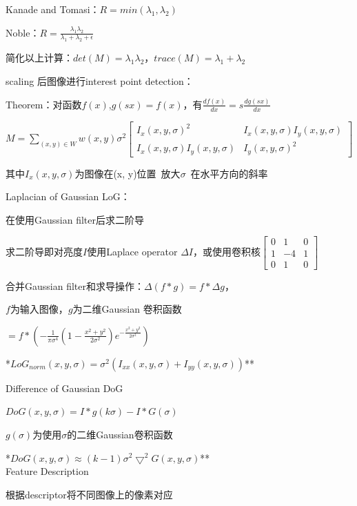 \documentclass[UTF8]{ctexart}
\begin{document}
  \quad \quad Kanade and Tomasi：$R = min(\lambda_1, \lambda_2)$

  \quad \quad Noble：$R = \frac{\lambda_1\lambda_2}{\lambda_1 + \lambda_2 + \epsilon}$

  \quad \quad 简化以上计算：$det(M) = \lambda_1\lambda_2$，$trace(M) = \lambda_1 + \lambda_2$

  scaling 后图像进行interest point detection：

  \quad Theorem：对函数$f(x)$,$g(sx) = f(x)$，有$\frac{df(x)}{dx} = s\frac{dg(sx)}{dx}$

  \quad $M = \sum_{(x, y) \in W}w(x, y)\sigma^2
    \begin{bmatrix}
      I_x(x, y, \sigma)^2 & I_x(x, y, \sigma)I_y(x, y, \sigma) \\
      I_x(x, y, \sigma)I_y(x, y, \sigma) & I_y(x, y, \sigma)^2
      \end{bmatrix}$

  \quad \quad 其中$I_x(x, y, \sigma)$为图像在(x, y)位置\ 放大$\sigma$\ 在水平方向的斜率

  Laplacian of Gaussian LoG：

  \quad 在使用Gaussian filter后求二阶导

  \quad \quad 求二阶导即对亮度$I$使用Laplace operator $\Delta I$，或使用卷积核$
    \begin{bmatrix}
      0 & 1 & 0 \\
      1 & -4 & 1 \\
      0 & 1 & 0
      \end{bmatrix}$

  \quad 合并Gaussian filter和求导操作：$\Delta (f * g) = f * \Delta g$，
  
  \quad \quad $f$为输入图像，$g$为二维Gaussian 卷积函数

  \quad \quad $ = f * (-\frac{1}{\pi\sigma^4}(1 - \frac{x^2 + y^2}{2\sigma^2})e^{-\frac{x^2 + y^2}{2\sigma^2}})$

  \quad **$LoG_{norm}(x, y, \sigma) = \sigma^2(I_{xx}(x, y, \sigma) + I_{yy}(x, y, \sigma))$**

  Difference of Gaussian DoG
  
  \quad $DoG(x, y, \sigma) = I * g(k\sigma) - I * G(\sigma)$
  
  \quad \quad $g(\sigma)$为使用$\sigma$的二维Gaussian卷积函数
  
  \quad **$DoG(x, y, \sigma) \approx (k - 1)\sigma^2\bigtriangledown^2G(x, y, \sigma)$**\\
Feature Description

  根据descriptor将不同图像上的像素对应
\end{document}
